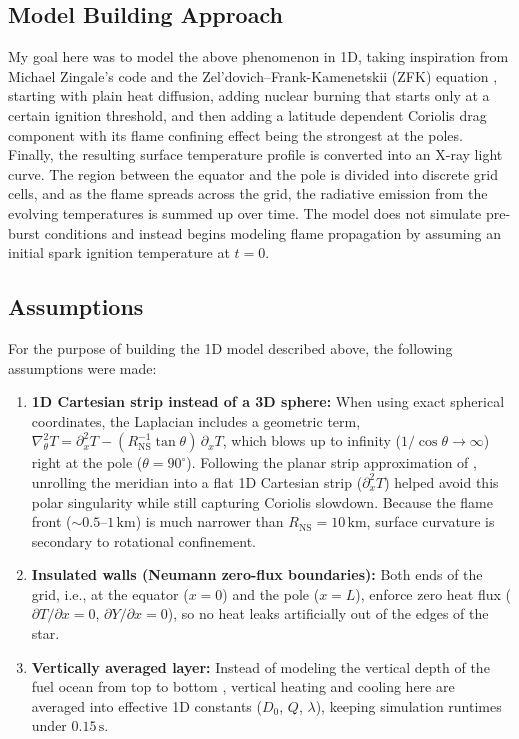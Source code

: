 \documentclass[11pt,a4paper]{article}
\begin{document}
\subsection{Model Building Approach}
My goal here was to model the above phenomenon in 1D, taking inspiration from Michael Zingale's code \citep{Zingale_HydroExamples} and the Zel'dovich--Frank-Kamenetskii (ZFK) equation \citep{Zeldovich1938,Eiden2020}, starting with plain heat diffusion, adding nuclear burning that starts only at a certain ignition threshold, and then adding a latitude dependent Coriolis drag component with its flame confining effect being the strongest at the poles. Finally, the resulting surface temperature profile is converted into an X-ray light curve. The region between the equator and the pole is divided into discrete grid cells, and as the flame spreads across the grid, the radiative emission from the evolving temperatures is summed up over time. The model does not simulate pre-burst conditions and instead begins modeling flame propagation by assuming an initial spark ignition temperature at $t = 0$.

\subsection{Assumptions}
For the purpose of building the 1D model described above, the following assumptions were made:
\begin{enumerate}
    \item \textbf{1D Cartesian strip instead of a 3D sphere:} When using exact spherical coordinates, the Laplacian includes a geometric term, $\nabla_\theta^2 T = \partial_x^2 T - (R_{\mathrm{NS}}^{-1}\tan\theta)\,\partial_x T$, which blows up to infinity ($1/\cos\theta \to \infty$) right at the pole ($\theta = 90^\circ$). Following the planar strip approximation of \citet{Spitkovsky2002}, unrolling the meridian into a flat 1D Cartesian strip ($\partial_x^2 T$) helped avoid this polar singularity while still capturing Coriolis slowdown. Because the flame front ($\sim 0.5$--$1\,\mathrm{km}$) is much narrower than $R_{\mathrm{NS}} = 10\,\mathrm{km}$, surface curvature is secondary to rotational confinement.
    \item \textbf{Insulated walls (Neumann zero-flux boundaries):} Both ends of the grid, i.e., at the equator ($x = 0$) and the pole ($x = L$), enforce zero heat flux ($\partial T / \partial x = 0$, $\partial Y / \partial x = 0$), so no heat leaks artificially out of the edges of the star.
    \item \textbf{Vertically averaged layer:} Instead of modeling the vertical depth of the fuel ocean from top to bottom \citep{Cumming2000}, vertical heating and cooling here are averaged into effective 1D constants ($D_0$, $Q$, $\lambda$), keeping simulation runtimes under $0.15\,\mathrm{s}$.
\end{enumerate}
\end{document}
